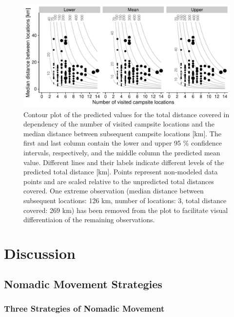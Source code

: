\documentclass[]{elsarticle} %
\begin{document}
\begin{figure}[H]

{\centering \includegraphics[width=\textwidth]{../figures/regression-plots1-1} 

}

\caption{Contour plot of the predicted values for the total distance covered in dependency of the number of visited campsite locations and the median distance between subsequent campsite locations [km]. The first and last column contain the lower and upper 95 \% confidence intervals, respectively, and the middle column the predicted mean value. Different lines and their labels indicate different levels of the predicted total distance [km]. Points represent non-modeled data points and are scaled relative to the unpredicted total distances covered. One extreme observation (median distance between subsequent locations: 126 km, number of locations: 3, total distance covered: 269 km) has been removed from the plot to facilitate visual differentiaion of the remaining observations.}\label{fig:regression-plots1}
\end{figure}

\hypertarget{discussion}{%
\section{Discussion}\label{discussion}}

\hypertarget{nomadic-movement-strategies}{%
\subsection{Nomadic Movement
Strategies}\label{nomadic-movement-strategies}}

\hypertarget{three-strategies-of-nomadic-movement}{%
\subsubsection{Three Strategies of Nomadic
Movement}\label{three-strategies-of-nomadic-movement}}
\end{document}
